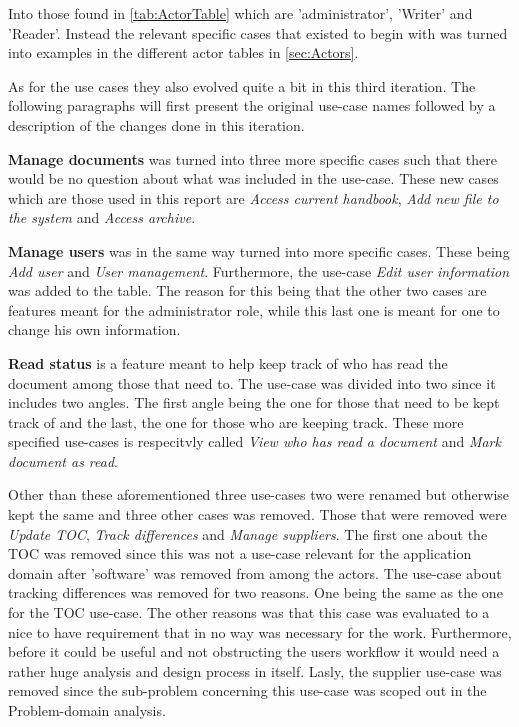 Into those found in \cref{tab:ActorTable} which are 'administrator', 'Writer' and 'Reader'. Instead the relevant specific cases that existed to begin with was turned into examples in the different actor tables in \cref{sec:Actors}.

As for the use cases they also evolved quite a bit in this third iteration.
The following paragraphs will first present the original use-case names followed by a description of the changes done in this iteration.

\textbf{Manage documents} was turned into three more specific cases such that there would be no question about what was included in the use-case.
These new cases which are those used in this report are \textit{Access current handbook}, \textit{Add new file to the system} and \textit{Access archive}.

\textbf{Manage users} was in the same way turned into more specific cases.
These being \textit{Add user} and \textit{User management}.
Furthermore, the use-case \textit{Edit user information} was added to the table.
The reason for this being that the other two cases are features meant for the administrator role, while this last one is meant for one to change his own information.

\textbf{Read status} is a feature meant to help keep track of who has read the document among those that need to.
The use-case was divided into two since it includes two angles.
The first angle being the one for those that need to be kept track of and the last, the one for those who are keeping track.
These more specified use-cases is respecitvly called \textit{View who has read a document} and \textit{Mark document as read}.

Other than these aforementioned three use-cases two were renamed but otherwise kept the same and three other cases was removed.
Those that were removed were \textit{Update TOC}, \textit{Track differences} and \textit{Manage suppliers}.
The first one about the TOC was removed since this was not a use-case relevant for the application domain after 'software' was removed from among the actors.
The use-case about tracking differences was removed for two reasons.
One being the same as the one for the TOC use-case.
The other reasons was that this case was evaluated to a nice to have requirement that in no way was necessary for the work.
Furthermore, before it could be useful and not obstructing the users workflow it would need a rather huge analysis and design process in itself.
Lasly, the supplier use-case was removed since the sub-problem concerning this use-case was scoped out in the Problem-domain analysis.

